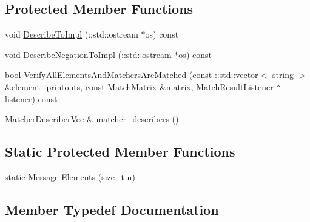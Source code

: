 \subsection*{Protected Member Functions}
\begin{DoxyCompactItemize}
\item 
void \hyperlink{classtesting_1_1internal_1_1UnorderedElementsAreMatcherImplBase_a025abc723fc4f2788c81eb1eca3838e9}{Describe\+To\+Impl} (\+::std\+::ostream $\ast$os) const 
\item 
void \hyperlink{classtesting_1_1internal_1_1UnorderedElementsAreMatcherImplBase_a40998516ce516b79f99db299c58b8231}{Describe\+Negation\+To\+Impl} (\+::std\+::ostream $\ast$os) const 
\item 
bool \hyperlink{classtesting_1_1internal_1_1UnorderedElementsAreMatcherImplBase_a0a12446ecc8fab75a551a77c322e7896}{Verify\+All\+Elements\+And\+Matchers\+Are\+Matched} (const \+::std\+::vector$<$ \hyperlink{namespacetesting_1_1internal_a8e8ff5b11e64078831112677156cb111}{string} $>$ \&element\+\_\+printouts, const \hyperlink{classtesting_1_1internal_1_1MatchMatrix}{Match\+Matrix} \&matrix, \hyperlink{classtesting_1_1MatchResultListener}{Match\+Result\+Listener} $\ast$listener) const 
\item 
\hyperlink{classtesting_1_1internal_1_1UnorderedElementsAreMatcherImplBase_a81ca7ce793d4b25ce2a7d3e28b48cd64}{Matcher\+Describer\+Vec} \& \hyperlink{classtesting_1_1internal_1_1UnorderedElementsAreMatcherImplBase_a04d4adc809d9c06331f8dbb67b879ac0}{matcher\+\_\+describers} ()
\end{DoxyCompactItemize}
\subsection*{Static Protected Member Functions}
\begin{DoxyCompactItemize}
\item 
static \hyperlink{classtesting_1_1Message}{Message} \hyperlink{classtesting_1_1internal_1_1UnorderedElementsAreMatcherImplBase_ab6d5a2342e07730b913f419cf662d16a}{Elements} (size\+\_\+t \hyperlink{app_2main_8cpp_acfc02ec89670db29251fda6a66602ce2}{n})
\end{DoxyCompactItemize}


\subsection{Member Typedef Documentation}
